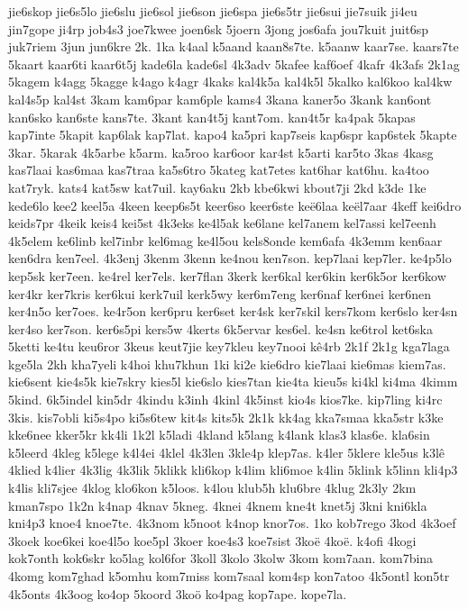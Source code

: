 {jie6skop
jie6s5lo
jie6slu
jie6sol
jie6son
jie6spa
jie6s5tr
jie6sui
jie7suik
ji4eu
jin7gope
ji4rp
job4s3
joe7kwee
joen6sk
5joern
3jong
jos6afa
jou7kuit
juit6sp
juk7riem
3jun
jun6kre
2k.
1ka
k4aal
k5aand
kaan8s7te.
k5aanw
kaar7se.
kaars7te
5kaart
kaar6ti
kaar6t5j
kade6la
kade6sl
4k3adv
5kafee
kaf6oef
4kafr
4k3afs
2k1ag
5kagem
k4agg
5kagge
k4ago
k4agr
4kaks
kal4k5a
kal4k5l
5kalko
kal6koo
kal4kw
kal4s5p
kal4st
3kam
kam6par
kam6ple
kams4
3kana
kaner5o
3kank
kan6ont
kan6sko
kan6ste
kans7te.
3kant
kan4t5j
kant7om.
kan4t5r
ka4pak
5kapas
kap7inte
5kapit
kap6lak
kap7lat.
kapo4
ka5pri
kap7seis
kap6spr
kap6stek
5kapte
3kar.
5karak
4k5arbe
k5arm.
ka5roo
kar6oor
kar4st
k5arti
kar5to
3kas
4kasg
kas7laai
kas6maa
kas7traa
ka5s6tro
5kateg
kat7etes
kat6har
kat6hu.
ka4too
kat7ryk.
kats4
kat5sw
kat7uil.
kay6aku
2kb
kbe6kwi
kbout7ji
2kd
k3de
1ke
kede6lo
kee2
keel5a
4keen
keep6s5t
keer6so
keer6ste
keë6laa
keël7aar
4keff
kei6dro
keids7pr
4keik
keis4
kei5st
4k3eks
ke4l5ak
ke6lane
kel7anem
kel7assi
kel7eenh
4k5elem
ke6linb
kel7inbr
kel6mag
ke4l5ou
kels8onde
kem6afa
4k3emm
ken6aar
ken6dra
ken7eel.
4k3enj
3kenm
3kenn
ke4nou
ken7son.
kep7laai
kep7ler.
ke4p5lo
kep5sk
ker7een.
ke4rel
ker7els.
ker7flan
3kerk
ker6kal
ker6kin
ker6k5or
ker6kow
ker4kr
ker7kris
ker6kui
kerk7uil
kerk5wy
ker6m7eng
ker6naf
ker6nei
ker6nen
ker4n5o
ker7oes.
ke4r5on
ker6pru
ker6set
ker4sk
ker7skil
kers7kom
ker6slo
ker4sn
ker4so
ker7son.
ker6s5pi
kers5w
4kerts
6k5ervar
kes6el.
ke4sn
ke6trol
ket6ska
5ketti
ke4tu
keu6ror
3keus
keut7jie
key7kleu
key7nooi
kê4rb
2k1f
2k1g
kga7laga
kge5la
2kh
kha7yeli
k4hoi
khu7khun
1ki
ki2e
kie6dro
kie7laai
kie6mas
kiem7as.
kie6sent
kie4s5k
kie7skry
kies5l
kie6slo
kies7tan
kie4ta
kieu5s
ki4kl
ki4ma
4kimm
5kind.
6k5indel
kin5dr
4kindu
k3inh
4kinl
4k5inst
kio4s
kios7ke.
kip7ling
ki4rc
3kis.
kis7obli
ki5s4po
ki5s6tew
kit4s
kits5k
2k1k
kk4ag
kka7smaa
kka5str
k3ke
kke6nee
kker5kr
kk4li
1k2l
k5ladi
4kland
k5lang
k4lank
klas3
klas6e.
kla6sin
k5leerd
4kleg
k5lege
k4l4ei
4klel
4k3len
3kle4p
klep7as.
k4ler
5klere
kle5us
k3lê
4klied
k4lier
4k3lig
4k3lik
5klikk
kli6kop
k4lim
kli6moe
k4lin
5klink
k5linn
kli4p3
k4lis
kli7sjee
4klog
klo6kon
k5loos.
k4lou
klub5h
klu6bre
4klug
2k3ly
2km
kman7spo
1k2n
k4nap
4knav
5kneg.
4knei
4knem
kne4t
knet5j
3kni
kni6kla
kni4p3
knoe4
knoe7te.
4k3nom
k5noot
k4nop
knor7os.
1ko
kob7rego
3kod
4k3oef
3koek
koe6kei
koe4l5o
koe5pl
3koer
koe4s3
koe7sist
3koë
4koë.
k4ofi
4kogi
kok7onth
kok6skr
ko5lag
kol6for
3koll
3kolo
3kolw
3kom
kom7aan.
kom7bina
4komg
kom7ghad
k5omhu
kom7miss
kom7saal
kom4sp
kon7atoo
4k5ontl
kon5tr
4k5onts
4k3oog
ko4op
5koord
3koö
ko4pag
kop7ape.
kope7la.
}
